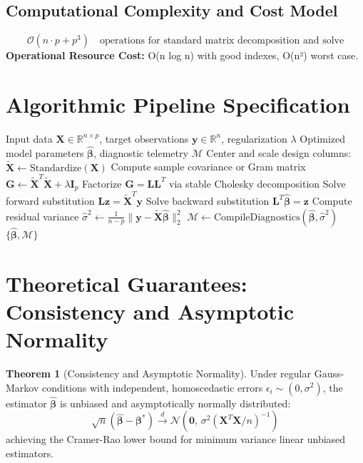 \documentclass[11pt,a4paper]{article}
\theoremstyle{definition}
\newtheorem{theorem}{\textbf{Theorem}}[section]
\begin{document}
\subsection{Computational Complexity and Cost Model}
\begin{equation}
\mathcal{O}(n \cdot p + p^3) \quad \text{operations for standard matrix decomposition and solve}
\end{equation}
\textbf{Operational Resource Cost:} O(n log n) with good indexes, O(n²) worst case.

\section{Algorithmic Pipeline Specification}

\begin{algorithm}[H]
\caption{DBSCAN Execution}
\begin{algorithmic}[1]
\Require Input data $\mathbf{X} \in \mathbb{R}^{n \times p}$, target observations $\mathbf{y} \in \mathbb{R}^n$, regularization $\lambda$
\Ensure Optimized model parameters $\hat{\boldsymbol{\beta}}$, diagnostic telemetry $\mathcal{M}$
\State Center and scale design columns: $\tilde{\mathbf{X}} \gets \text{Standardize}(\mathbf{X})$
\State Compute sample covariance or Gram matrix $\mathbf{G} \gets \tilde{\mathbf{X}}^T \tilde{\mathbf{X}} + \lambda \mathbf{I}_p$
\State Factorize $\mathbf{G} = \mathbf{L} \mathbf{L}^T$ via stable Cholesky decomposition
\State Solve forward substitution $\mathbf{L} \mathbf{z} = \tilde{\mathbf{X}}^T \mathbf{y}$
\State Solve backward substitution $\mathbf{L}^T \hat{\boldsymbol{\beta}} = \mathbf{z}$
\State Compute residual variance $\hat{\sigma}^2 \gets \frac{1}{n - p} \| \mathbf{y} - \tilde{\mathbf{X}} \hat{\boldsymbol{\beta}} \|_2^2$
\State $\mathcal{M} \gets \text{CompileDiagnostics}(\hat{\boldsymbol{\beta}}, \hat{\sigma}^2)$
\State \Return $\{\hat{\boldsymbol{\beta}}, \mathcal{M}\}$
\end{algorithmic}
\end{algorithm}

\section{Theoretical Guarantees: Consistency and Asymptotic Normality}

\begin{theorem}[Consistency and Asymptotic Normality]
Under regular Gauss-Markov conditions with independent, homoscedastic errors $\epsilon_i \sim (0, \sigma^2)$, the estimator $\hat{\boldsymbol{\beta}}$ is unbiased and asymptotically normally distributed:
\begin{equation}
\sqrt{n}(\hat{\boldsymbol{\beta}} - \boldsymbol{\beta}^*) \xrightarrow{d} \mathcal{N}\left(\mathbf{0}, \, \sigma^2 (\mathbf{X}^T \mathbf{X} / n)^{-1}\right)
\end{equation}
achieving the Cramer-Rao lower bound for minimum variance linear unbiased estimators.
\end{theorem}
\end{document}
